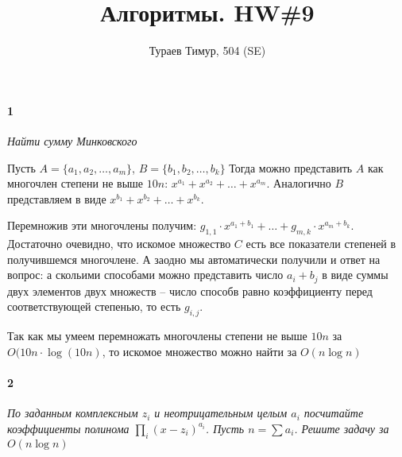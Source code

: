 \documentclass[russian]{article}
\begin{document}
\title{Алгоритмы. HW\#9}
\author{Тураев Тимур, 504 (SE)}
\maketitle

\paragraph*{1}

\textit{Найти сумму Минковского}

Пусть $A = \{a_1, a_2, \ldots, a_m \}$, $B = \{b_1, b_2, \ldots, b_k \}$
Тогда можно представить $A$ как многочлен степени не выше $10n$: $x^{a_1} + x^{a_2} + \ldots + x^{a_m}$. Аналогично $B$ представляем в виде $x^{b_1} + x^{b_2} + \ldots + x^{b_k}$.

Перемножив эти многочлены получим: $g_{1,1} \cdot x^{a_1 + b_1} + \ldots + g_{m,k} \cdot x^{a_m + b_k}$. Достаточно очевидно, что искомое множество $C$ есть все показатели степеней в получившемся многочлене. А заодно мы автоматически получили и ответ на вопрос: а скольими способами можно представить число $a_i + b_j$ в виде суммы двух элементов двух множеств -- число способв равно коэффициенту перед соответствующей степенью, то есть $g_{i, j}$. 

Так как мы умеем перемножать многочлены степени не выше $10n$ за $O(10n \cdot \log(10n)$, то искомое множество можно найти за $O(n\log n)$

\paragraph*{2}

\textit{По заданным комплексным $z_i$ и неотрицательным целым $a_i$ посчитайте коэффициенты полинома $\prod_i(x-z_i)^{a_i}$. Пусть $n = \sum a_i$. Решите задачу за $O(n \log n)$}
\end{document}
